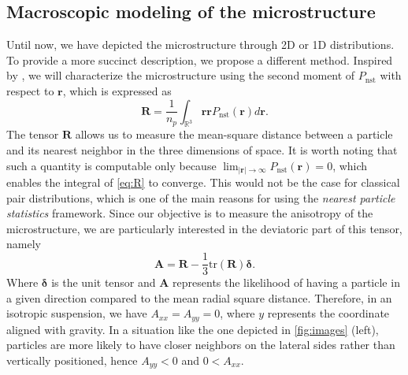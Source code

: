 \documentclass[11pt]{My_preprint}
\begin{document}
\subsection{Macroscopic modeling of the microstructure}
Until now, we have depicted the microstructure through 2D or 1D distributions. To provide a more succinct description, we propose a different method. 
Inspired by \citet{zhang2023evolution}, we will characterize the microstructure using the second moment of $P_\text{nst}$ with respect to $\mathbf{r}$, which is expressed as
\begin{equation}
    \textbf{R} =\frac{1}{n_p} 
\int_{\mathbb{R}^3} 
    \textbf{rr} P_\text{nst}(\textbf{r}) d\textbf{r}.
    \label{eq:R}
\end{equation}
The tensor $\textbf{R}$ allows us to measure the mean-square distance between a particle and its nearest neighbor in the three dimensions of space.
It is worth noting that such a quantity is computable only because $\lim_{|\textbf{r}|\to \infty} P_\text{nst}(\textbf{r}) = 0$, which enables the integral of \ref{eq:R} to converge. 
This would not be the case for classical pair distributions, which is one of the main reasons for using the \textit{nearest particle statistics} framework. Since our objective is to measure the anisotropy of the microstructure, we are particularly interested in the deviatoric part of this tensor, namely
\begin{equation*}
    \textbf{A} = \textbf{R} - \frac{1}{3}  \text{tr}(\textbf{R}) \bm\delta.
\end{equation*}
Where $\bm\delta$ is the unit tensor and 
$\textbf{A}$ represents the likelihood of having a particle in a given direction compared to the mean radial square distance. 
Therefore, in an isotropic suspension, we have $A_{xx} = A_{yy} = 0$, where $y$ represents the coordinate aligned with gravity. 
In a situation like the one depicted in \ref{fig:images} (left), particles are more likely to have closer neighbors on the lateral sides rather than vertically positioned, hence  $A_{yy} < 0$ and $0 < A_{xx}$. 
\end{document}
